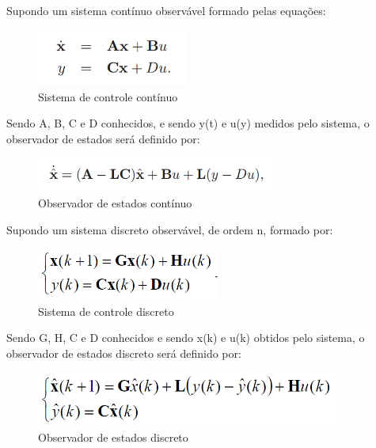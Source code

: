 \documentclass[a4paper,12pt]{article}
\begin{document}
Supondo um sistema contínuo observável formado pelas equações:
\newpage
\begin{figure}[H]
\centering
\includegraphics[width=5cm]{fotosLab5/sistema_continuo.png}
\caption{Sistema de controle contínuo}
\label{continuo}
\end{figure}

Sendo A, B, C e D conhecidos, e sendo y(t) e u(y) medidos pelo sistema, o observador de estados será definido por:

\begin{figure}[H]
\centering
\includegraphics[width=8cm]{fotosLab5/observador_continuo.png}
\caption{Observador de estados contínuo}
\label{continuo}
\end{figure}

\vspace{0.7cm}
\hspace{6ex}{\bf 2. Caso discreto}

Supondo um sistema discreto observável, de ordem n, formado por:

\begin{figure}[h]
\centering
\includegraphics[width=6cm]{fotosLab5/sistema_discreto.png}
\caption{Sistema de controle discreto}
\label{sist_discreto}
\end{figure}

Sendo G, H, C e D conhecidos e sendo x(k) e u(k) obtidos pelo sistema, o observador de estados discreto será definido por:

\begin{figure}[h]
\centering
\includegraphics[width=10cm]{fotosLab5/observador_discreto.png}
\caption{Observador de estados discreto}
\label{ob_discreto}
\end{figure}
\end{document}
